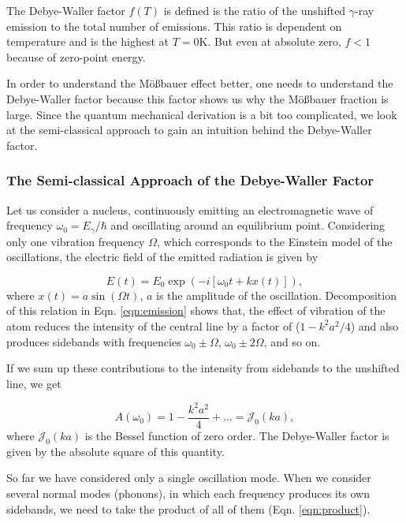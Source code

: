 \documentclass[a4paper]{report}
\numberwithin{equation}{section}
\begin{document}
The Debye-Waller factor $f(T)$ is defined is the ratio of the unshifted $\gamma$-ray emission to the total number of emissions. This ratio is dependent on temperature and is the highest at $T = 0 \si{\kelvin}$. But even at absolute zero, $f < 1$ because of zero-point energy. 

In order to understand the M\"o{\ss}bauer effect better, one needs to understand the Debye-Waller factor because this factor shows us why the M\"o{\ss}bauer fraction is large. Since the quantum mechanical derivation is a bit too complicated, we look at the semi-classical approach to gain an intuition behind the Debye-Waller factor.

\subsubsection{The Semi-classical Approach of the Debye-Waller Factor}
Let us consider a nucleus, continuously emitting an electromagnetic wave of frequency $\omega_{0} = E_{\gamma}/\hbar $ and oscillating around an equilibrium point. Considering only one vibration frequency $\Omega$, which corresponds to the Einstein model of the oscillations, the electric field of the emitted radiation is given by

\begin{equation} \label{eqn:emission}
		E(t) = E_{0} \exp\left(- i [\omega_{0} t + k x(t) ] \right),
\end{equation}
where $x(t) = a \sin (\Omega t)$, $a$ is the amplitude of the oscillation. Decomposition of this relation in Eqn. \ref{eqn:emission} shows that, the effect of vibration of the atom reduces the intensity of the central line by a factor of ($1 - k^2 a^2 / 4$) and also produces sidebands with frequencies $\omega_{0} \pm \Omega$, $\omega_{0} \pm 2 \Omega$, and so on. 

If we sum up these contributions to the intensity from sidebands to the unshifted line, we get

\begin{equation}
		A(\omega_{0}) = 1 - \frac{k^2 a^2}{4} + ... = \mathcal{J}_{0} (ka),
\end{equation}
where $\mathcal{J}_{0} (ka)$ is the Bessel function of zero order. The Debye-Waller factor is given by the absolute square of this quantity. 

So far we have considered only a single oscillation mode. When we consider several normal modes (phonons), in which each frequency produces its own sidebands, we need to take the product of all of them (Eqn. \ref{eqn:product}). 
\end{document}
